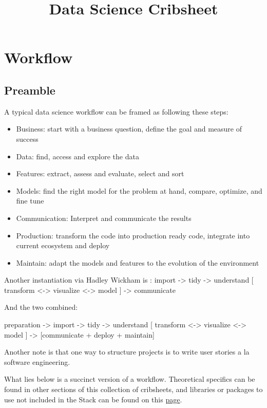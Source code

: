 \documentclass[]{book}
\title{Data Science Cribsheet}
\author{}
\date{}
\begin{document}
\maketitle

{
\setcounter{tocdepth}{1}
\tableofcontents
}
\chapter{Workflow}\label{workflow}

\section{Preamble}\label{preamble}

A typical data science workflow can be framed as following these steps:

\begin{itemize}
\item
  Business: start with a business question, define the goal and measure
  of success
\item
  Data: find, access and explore the data
\item
  Features: extract, assess and evaluate, select and sort
\item
  Models: find the right model for the problem at hand, compare,
  optimize, and fine tune
\item
  Communication: Interpret and communicate the results
\item
  Production: transform the code into production ready code, integrate
  into current ecosystem and deploy
\item
  Maintain: adapt the models and features to the evolution of the
  environment
\end{itemize}

Another instantiation via Hadley Wickham is : import -\textgreater{}
tidy -\textgreater{} understand {[} transform \textless{}-\textgreater{}
visualize \textless{}-\textgreater{} model {]} -\textgreater{}
communicate

And the two combined:

preparation -\textgreater{} import -\textgreater{} tidy -\textgreater{}
understand {[} transform \textless{}-\textgreater{} visualize
\textless{}-\textgreater{} model {]} -\textgreater{} {[}communicate +
deploy + maintain{]}

Another note is that one way to structure projects is to write user
stories a la software engineering.

What lies below is a succinct version of a workflow. Theoretical
specifics can be found in other sections of this collection of
cribsheets, and libraries or packages to use not included in the Stack
can be found on this
\href{https://gfleetwood.github.io/noted-resources/data_science.html}{page}.
\end{document}
